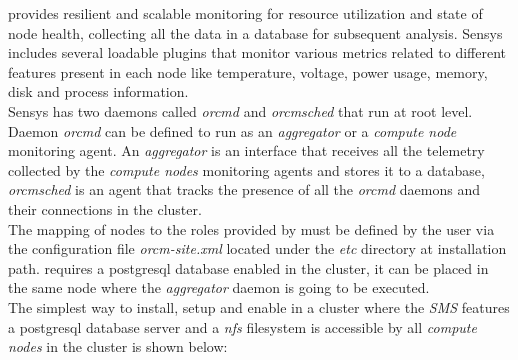 \Sensys{} provides resilient and scalable monitoring for resource utilization
and state of node health, collecting all the data in a database for subsequent
analysis. Sensys includes several loadable plugins that monitor various metrics
related to different features present in each node like temperature, voltage,
power usage, memory, disk and process information.\\

\noindent Sensys has two daemons called {\em orcmd} and {\em orcmsched} that run
at root level. Daemon {\em orcmd} can be defined to run as an {\em aggregator}
or a {\em compute node} monitoring agent.
An {\em aggregator} is an interface that receives all the telemetry collected by
the {\em compute nodes} monitoring agents and stores it to a database, {\em
orcmsched} is an agent that tracks the presence of all the {\em orcmd} daemons
and their connections in the cluster.\\
The mapping of nodes to the roles provided by \Sensys{} must be defined by the
user via the configuration file {\em orcm-site.xml} located under the {\em etc}
directory at \Sensys{} installation path.
\Sensys{} requires a postgresql database enabled in the cluster, it can be
placed in the same node where the {\em aggregator} daemon is going to be
executed. \\

\noindent The simplest way to install, setup and enable \Sensys{} in a cluster
where the {\em SMS} features a postgresql database server and a {\em nfs}
filesystem is accessible by all {\em compute nodes} in the cluster is shown
below:

